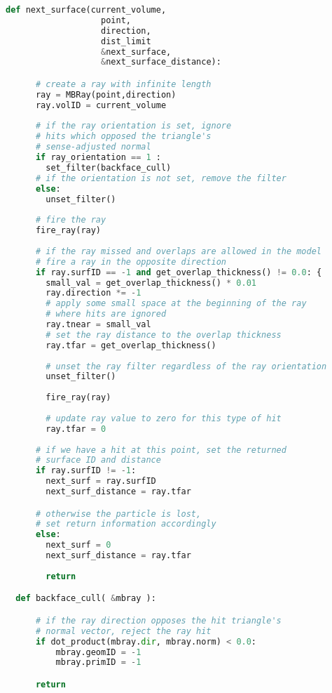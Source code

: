 \begin{lstlisting}[language=Python,basicstyle=\tiny]
  def next_surface(current_volume,
                   point,
                   direction,
                   dist_limit
                   &next_surface,
                   &next_surface_distance):

      # create a ray with infinite length
      ray = MBRay(point,direction)
      ray.volID = current_volume
    
      # if the ray orientation is set, ignore
      # hits which opposed the triangle's
      # sense-adjusted normal
      if ray_orientation == 1 :
        set_filter(backface_cull)
      # if the orientation is not set, remove the filter
      else:
        unset_filter()
    
      # fire the ray
      fire_ray(ray)
    
      # if the ray missed and overlaps are allowed in the model
      # fire a ray in the opposite direction
      if ray.surfID == -1 and get_overlap_thickness() != 0.0: {
        small_val = get_overlap_thickness() * 0.01
        ray.direction *= -1
        # apply some small space at the beginning of the ray
        # where hits are ignored
        ray.tnear = small_val
        # set the ray distance to the overlap thickness
        ray.tfar = get_overlap_thickness()
    
        # unset the ray filter regardless of the ray orientation
        unset_filter()
    
        fire_ray(ray)
        
        # update ray value to zero for this type of hit
        ray.tfar = 0
    
      # if we have a hit at this point, set the returned
      # surface ID and distance
      if ray.surfID != -1:
        next_surf = ray.surfID
        next_surf_distance = ray.tfar

      # otherwise the particle is lost,
      # set return information accordingly
      else:
        next_surf = 0
        next_surf_distance = ray.tfar
    
        return

  def backface_cull( &mbray ):

      # if the ray direction opposes the hit triangle's
      # normal vector, reject the ray hit
      if dot_product(mbray.dir, mbray.norm) < 0.0:
          mbray.geomID = -1
          mbray.primID = -1

      return

\end{lstlisting}

